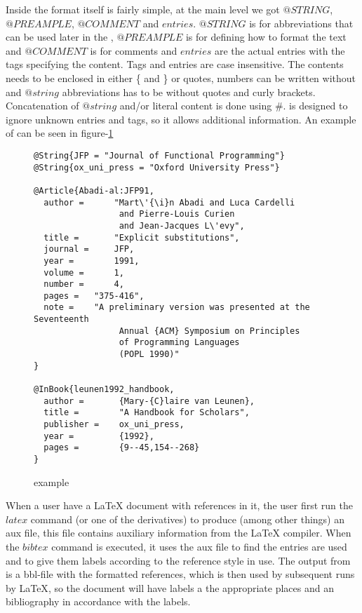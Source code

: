Inside {\bibtex} the format itself is fairly simple, at the main level
we got $@STRING$, $@PREAMPLE$, $@COMMENT$ and $entries$.  $@STRING$ is
for abbreviations that can be used later in the {\bibtex}, $@PREAMPLE$
is for defining how to format the text and $@COMMENT$ is for comments
and $entries$ are the actual entries with the tags specifying the
content.  Tags and entries are case insensitive. The contents needs to
be enclosed in either \{ and \} or quotes, numbers can be written
without and $@string$ abbreviations has to be without quotes and curly
brackets. Concatenation of $@string$ and/or literal content is done
using \#\cite{bibtex_resource}.  {\bibtex} is designed to ignore
unknown entries and tags, so it allows additional information.  An
example of {\bibtex} can be seen in figure-\ref{fig:bibtex_example}

\begin{figure}[ht]
  \centering
  \begin{small}
\begin{verbatim}
@String{JFP = "Journal of Functional Programming"}
@String{ox_uni_press = "Oxford University Press"}

@Article{Abadi-al:JFP91,
  author =      "Mart\'{\i}n Abadi and Luca Cardelli
                 and Pierre-Louis Curien
                 and Jean-Jacques L\'evy",
  title =       "Explicit substitutions",
  journal =     JFP,
  year =        1991,
  volume =      1,
  number =      4,
  pages =	"375-416",
  note =	"A preliminary version was presented at the Seventeenth
                 Annual {ACM} Symposium on Principles
                 of Programming Languages
                 (POPL 1990)"
}

@InBook{leunen1992_handbook,
  author =       {Mary-{C}laire van Leunen},
  title =        "A Handbook for Scholars",
  publisher =    ox_uni_press,
  year =         {1992},
  pages =        {9--45,154--268}
}
\end{verbatim}
  \end{small}
  \caption{{\bibtex} example}
\label{fig:bibtex_example}
\end{figure}

When a user have a {\LaTeX} document with {\bibtex} references in it,
the user first run the $latex$ command (or one of the derivatives) to
produce (among other things) an aux file, this file contains auxiliary
information from the {\LaTeX} compiler.  When the $bibtex$ command is
executed, it uses the aux file to find the entries are used and to
give them labels according to the reference style in use.  The output
from {\bibtex} is a bbl-file with the formatted references, which is
then used by subsequent runs by {\LaTeX}, so the document will have
labels a the appropriate places and an bibliography in accordance
with the labels.

